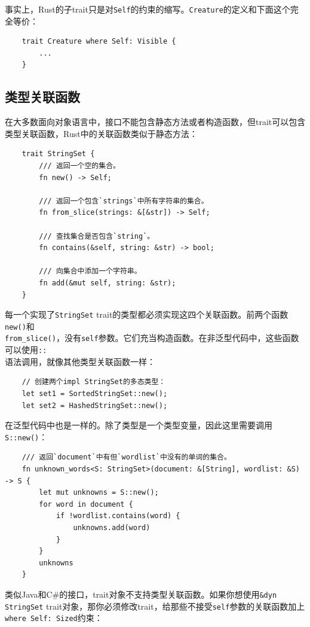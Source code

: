事实上，Rust的子trait只是对\texttt{Self}的约束的缩写。\texttt{Creature}的定义和下面这个完全等价：
\begin{verbatim}
    trait Creature where Self: Visible {
        ...
    }
\end{verbatim}

\subsection{类型关联函数}
在大多数面向对象语言中，接口不能包含静态方法或者构造函数，但trait可以包含类型关联函数，Rust中的关联函数类似于静态方法：
\begin{verbatim}
    trait StringSet {
        /// 返回一个空的集合。
        fn new() -> Self;
        
        /// 返回一个包含`strings`中所有字符串的集合。
        fn from_slice(strings: &[&str]) -> Self;

        /// 查找集合是否包含`string`。
        fn contains(&self, string: &str) -> bool;

        /// 向集合中添加一个字符串。
        fn add(&mut self, string: &str);
    }
\end{verbatim}

每一个实现了\texttt{StringSet} trait的类型都必须实现这四个关联函数。前两个函数\texttt{new()}和\\
\texttt{from\_slice()}，没有\texttt{self}参数。它们充当构造函数。在非泛型代码中，这些函数可以使用\texttt{::}\\
语法调用，就像其他类型关联函数一样：
\begin{verbatim}
    // 创建两个impl StringSet的多态类型：
    let set1 = SortedStringSet::new();
    let set2 = HashedStringSet::new();
\end{verbatim}

在泛型代码中也是一样的。除了类型是一个类型变量，因此这里需要调用\texttt{S::new()}：
\begin{verbatim}
    /// 返回`document`中有但`wordlist`中没有的单词的集合。
    fn unknown_words<S: StringSet>(document: &[String], wordlist: &S) -> S {
        let mut unknowns = S::new();
        for word in document {
            if !wordlist.contains(word) {
                unknowns.add(word)
            }
        }
        unknowns
    }
\end{verbatim}

类似Java和C\#的接口，trait对象不支持类型关联函数。如果你想使用\texttt{\&dyn StringSet} trait对象，那你必须修改trait，给那些不接受\texttt{self}参数的关联函数加上\texttt{where Self: Sized}约束：

